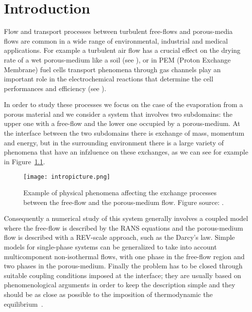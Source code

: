 \chapter{Introduction}
Flow and transport processes between turbulent free-flows and porous-media 
flows 
are common in a wide range of environmental, industrial and medical 
applications. For example a turbulent air flow has a crucial effect on the 
drying rate of a wet porous-medium like a soil (see \cite{paper:fetzer}), or 
in PEM (Proton Exchange Membrane) fuel cells transport phenomena through gas 
channels play an important 
role in the electrochemical reactions that determine the cell performances and 
efficiency (see \cite{wu:fuelcell}).

In order to study these processes we focus on the case of the evaporation from 
a porous material and we consider a system that involves two subdomains: the 
upper 
one with a free-flow and the lower one occupied by a porous-medium. At the 
interface between the two subdomains there is exchange of mass, momentum and 
energy, but in the surrounding environment there is a large variety of 
phenomena that have an infzluence on these exchanges, as we can see for example 
in Figure~\ref{fig:intro}.
\begin{figure}[ht]
	\centering
	\texttt{[image: intropicture.png]}
	\caption[Exchange processes between free and porous-medium 
	flows]{Example of physical phenomena affecting the exchange processes 
	between the free-flow and the porous-medium flow. Figure source: 
	\cite{tesi:fetzer}.}
	\label{fig:intro}
\end{figure}
Consequently a numerical study of this system generally involves a coupled 
model where the free-flow is described by the RANS equations and the 
porous-medium flow is described with a REV-scale approach, such as the Darcy's 
law. 
Simple models for single-phase systems can be generalized to take 
into account multicomponent non-isothermal flows, with one phase in the 
free-flow region and two phases in the porous-medium. Finally the problem 
has to be closed through suitable coupling conditions imposed at the 
interface; they are usually based on phenomenological arguments in order to 
keep the description simple and they should be as close as possible to the 
imposition of thermodynamic the equilibrium~\cite{paper:mosthaf}.

